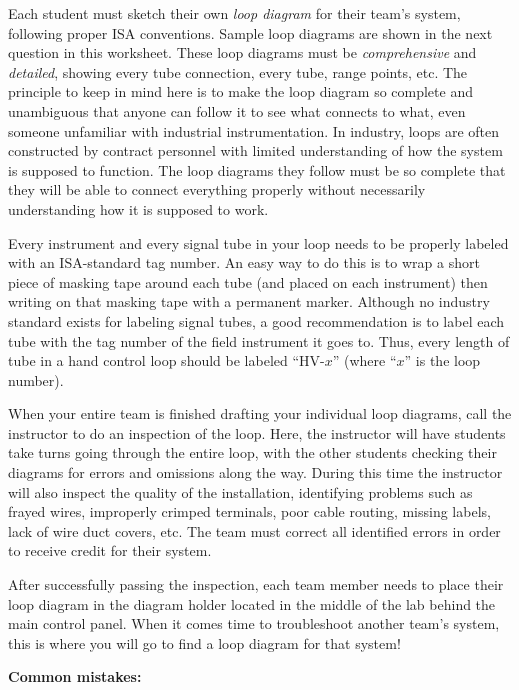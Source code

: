 Each student must sketch their own {\it loop diagram} for their team's system, following proper ISA conventions.  Sample loop diagrams are shown in the next question in this worksheet.  These loop diagrams must be {\it comprehensive} and {\it detailed}, showing every tube connection, every tube, range points, etc.  The principle to keep in mind here is to make the loop diagram so complete and unambiguous that anyone can follow it to see what connects to what, even someone unfamiliar with industrial instrumentation.  In industry, loops are often constructed by contract personnel with limited understanding of how the system is supposed to function.  The loop diagrams they follow must be so complete that they will be able to connect everything properly without necessarily understanding how it is supposed to work.

Every instrument and every signal tube in your loop needs to be properly labeled with an ISA-standard tag number.  An easy way to do this is to wrap a short piece of masking tape around each tube (and placed on each instrument) then writing on that masking tape with a permanent marker.  Although no industry standard exists for labeling signal tubes, a good recommendation is to label each tube with the tag number of the field instrument it goes to.  Thus, every length of tube in a hand control loop should be labeled ``HV-$x$'' (where ``$x$'' is the loop number).

When your entire team is finished drafting your individual loop diagrams, call the instructor to do an inspection of the loop.  Here, the instructor will have students take turns going through the entire loop, with the other students checking their diagrams for errors and omissions along the way.  During this time the instructor will also inspect the quality of the installation, identifying problems such as frayed wires, improperly crimped terminals, poor cable routing, missing labels, lack of wire duct covers, etc.  The team must correct all identified errors in order to receive credit for their system.  

After successfully passing the inspection, each team member needs to place their loop diagram in the diagram holder located in the middle of the lab behind the main control panel.  When it comes time to troubleshoot another team's system, this is where you will go to find a loop diagram for that system!

\vskip 10pt

{\bf Common mistakes:}

